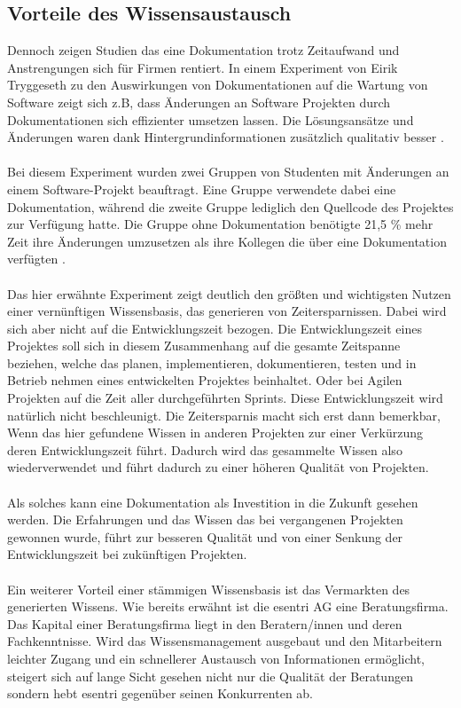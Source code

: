 \documentclass[a4paper,12pt]{scrartcl}
\begin{document}
\subsection{Vorteile des Wissensaustausch}
\label{Zeitersparnis}
Dennoch zeigen Studien das eine Dokumentation trotz Zeitaufwand und Anstrengungen sich für Firmen rentiert. In einem Experiment von Eirik Tryggeseth zu den Auswirkungen von Dokumentationen auf die Wartung von Software zeigt sich z.B, dass Änderungen an Software Projekten durch Dokumentationen sich effizienter umsetzen lassen. Die Lösungsansätze und Änderungen waren dank Hintergrundinformationen zusätzlich qualitativ besser \cite{Tryggeseth1997}.
\\\\
Bei diesem Experiment wurden zwei Gruppen von Studenten mit Änderungen an einem Software-Projekt beauftragt. Eine Gruppe verwendete dabei eine Dokumentation, während die zweite Gruppe lediglich den Quellcode des Projektes zur Verfügung hatte. Die Gruppe ohne Dokumentation benötigte 21,5 \% mehr Zeit ihre Änderungen umzusetzen als ihre Kollegen die über eine Dokumentation verfügten \cite{Tryggeseth1997}.
\\\\
Das hier erwähnte Experiment zeigt deutlich den größten und wichtigsten Nutzen einer vernünftigen Wissensbasis, das generieren von Zeitersparnissen. Dabei wird sich aber nicht auf die Entwicklungszeit bezogen. Die Entwicklungszeit eines Projektes soll sich in diesem Zusammenhang auf die gesamte Zeitspanne beziehen, welche das planen, implementieren, dokumentieren, testen und in Betrieb nehmen eines entwickelten Projektes beinhaltet. Oder bei Agilen Projekten auf die Zeit aller durchgeführten Sprints. Diese Entwicklungszeit wird natürlich nicht beschleunigt. Die Zeitersparnis macht sich erst dann bemerkbar, Wenn das hier gefundene Wissen in anderen Projekten zur einer Verkürzung deren Entwicklungszeit führt. Dadurch wird das gesammelte Wissen also wiederverwendet und führt dadurch zu einer höheren Qualität von Projekten.
\\\\
Als solches kann eine Dokumentation als Investition in die Zukunft gesehen werden. Die Erfahrungen und das Wissen das bei vergangenen Projekten gewonnen wurde, führt zur besseren Qualität und von einer Senkung der Entwicklungszeit bei zukünftigen Projekten.
\\\\
Ein weiterer Vorteil einer stämmigen Wissensbasis ist das Vermarkten des generierten Wissens. Wie bereits erwähnt ist die esentri AG eine Beratungsfirma. Das Kapital einer Beratungsfirma liegt in den Beratern/innen und deren Fachkenntnisse. Wird das Wissensmanagement ausgebaut und den Mitarbeitern leichter Zugang und ein schnellerer Austausch von Informationen ermöglicht, steigert sich auf lange Sicht gesehen nicht nur die Qualität der Beratungen sondern hebt esentri gegenüber seinen Konkurrenten ab.
\end{document}
